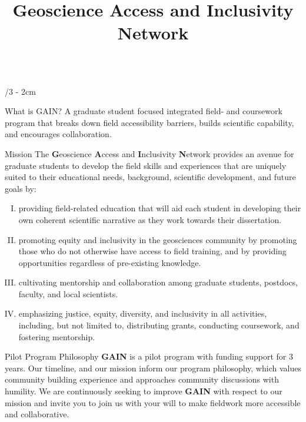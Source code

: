 \documentclass[landscape]{uwposter}
\title{Geoscience Access and Inclusivity Network}
\begin{document}
\begin{frame}
\begin{columns}[onlytextwidth]




\begin{column}{\textwidth/3 - 2cm}
\begin{block}{\alert{What is GAIN?}}
    A graduate student focused integrated field- and coursework program that breaks down field accessibility barriers, builds scientific capability, and encourages collaboration.

\end{block}

    \begin{block}{Mission}
       	The \textbf{\alert{G}}eoscience \textbf{\alert{A}}ccess and \textbf{\alert{I}}nclusivity \textbf{\alert{N}}etwork provides an avenue for graduate students to develop the field skills and experiences that are uniquely suited to their educational needs, background, scientific development, and future goals by:
         \begin{enumerate}[I.]
         \item
    	providing field-related education that will aid each student in developing their own coherent scientific narrative as they work towards their dissertation.
    	\item
	promoting equity and inclusivity in the geosciences community by promoting those who do not otherwise have access to field training, and by providing opportunities regardless of pre-existing knowledge.
    	\item
	cultivating mentorship and collaboration among graduate students, postdocs, faculty, and local scientists.
    	\item
	emphasizing justice, equity, diversity, and inclusivity in all activities, including, but not limited to, distributing grants, conducting coursework, and fostering mentorship.
	\end{enumerate}
	
    \end{block}
    
    \begin{block}{Pilot Program Philosophy}
    \textbf{\alert{GAIN}} is a pilot program with funding support for 3 years.
    Our timeline, and our mission inform our program philosophy, which values community building experience and approaches community discussions with humility. We are continuously seeking to improve \textbf{\alert{GAIN}} with respect to our mission and invite you to join us with your will to make fieldwork more accessible and collaborative.
    

\end{block}
\end{column}
\end{columns}
\end{frame}
\end{document}
